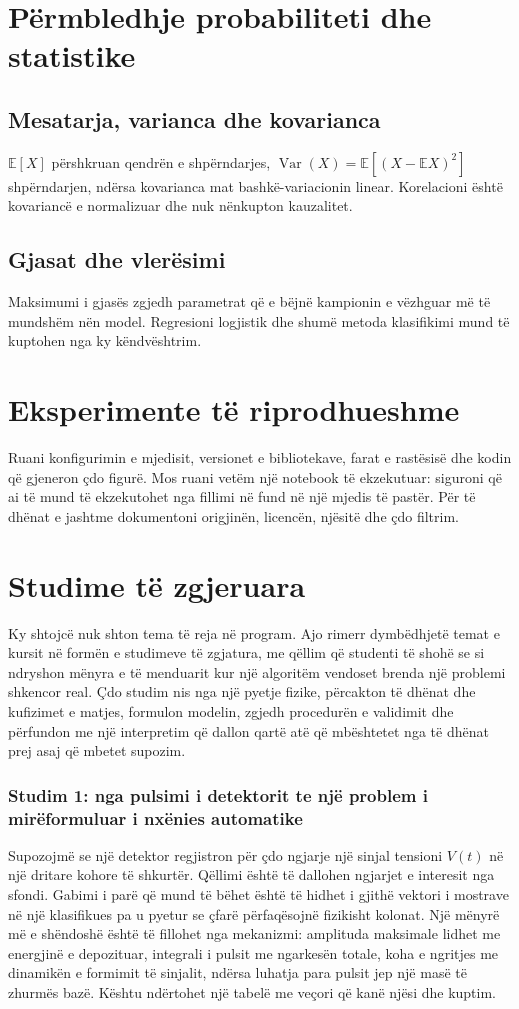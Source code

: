 \documentclass[12pt,a4paper,oneside]{book}
\newcommand{\E}{\mathbb{E}}
\newcommand{\Var}{\operatorname{Var}}
\begin{document}
\chapter[Probabilitet dhe statistikë]{Përmbledhje probabiliteti dhe statistike}
\section{Mesatarja, varianca dhe kovarianca}
$\E[X]$ përshkruan qendrën e shpërndarjes, $\Var(X)=\E[(X-\E X)^2]$ shpërndarjen, ndërsa kovarianca mat bashkë-variacionin linear. Korelacioni është kovariancë e normalizuar dhe nuk nënkupton kauzalitet.
\section{Gjasat dhe vlerësimi}
Maksimumi i gjasës zgjedh parametrat që e bëjnë kampionin e vëzhguar më të mundshëm nën model. Regresioni logjistik dhe shumë metoda klasifikimi mund të kuptohen nga ky këndvështrim.
\chapter[Riprodhueshmëria]{Eksperimente të riprodhueshme}
Ruani konfigurimin e mjedisit, versionet e bibliotekave, farat e rastësisë dhe kodin që gjeneron çdo figurë. Mos ruani vetëm një notebook të ekzekutuar: siguroni që ai të mund të ekzekutohet nga fillimi në fund në një mjedis të pastër. Për të dhënat e jashtme dokumentoni origjinën, licencën, njësitë dhe çdo filtrim.

\chapter[Studime të zgjeruara]{Studime të zgjeruara}
Ky shtojcë nuk shton tema të reja në program. Ajo rimerr dymbëdhjetë temat e kursit në formën e studimeve të zgjatura, me qëllim që studenti të shohë se si ndryshon mënyra e të menduarit kur një algoritëm vendoset brenda një problemi shkencor real. Çdo studim nis nga një pyetje fizike, përcakton të dhënat dhe kufizimet e matjes, formulon modelin, zgjedh procedurën e validimit dhe përfundon me një interpretim që dallon qartë atë që mbështetet nga të dhënat prej asaj që mbetet supozim.

\subsection*{Studim 1: nga pulsimi i detektorit te një problem i mirëformuluar i nxënies automatike}
Supozojmë se një detektor regjistron për çdo ngjarje një sinjal tensioni $V(t)$ në një dritare kohore të shkurtër. Qëllimi është të dallohen ngjarjet e interesit nga sfondi. Gabimi i parë që mund të bëhet është të hidhet i gjithë vektori i mostrave në një klasifikues pa u pyetur se çfarë përfaqësojnë fizikisht kolonat. Një mënyrë më e shëndoshë është të fillohet nga mekanizmi: amplituda maksimale lidhet me energjinë e depozituar, integrali i pulsit me ngarkesën totale, koha e ngritjes me dinamikën e formimit të sinjalit, ndërsa luhatja para pulsit jep një masë të zhurmës bazë. Kështu ndërtohet një tabelë me veçori që kanë njësi dhe kuptim.
\end{document}
